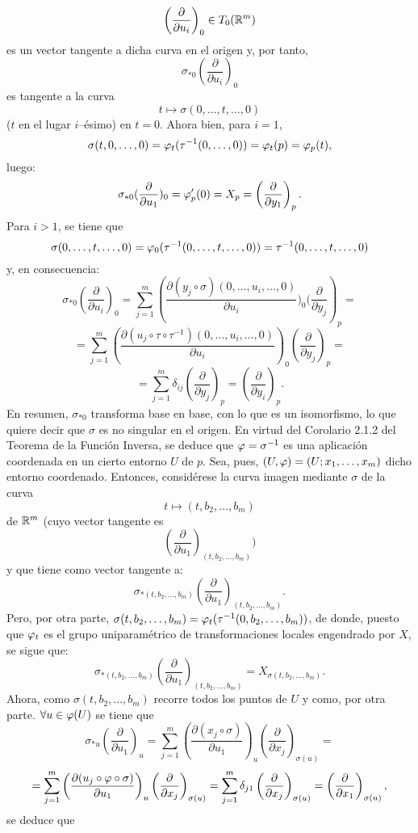 \documentclass[cursovd_portada.tex]{subfiles}
\begin{document}
$$\left(\frac{\partial}{\partial u_i}\right)_0\in T_0(\mathbb{R}^m)$$
es un vector tangente a dicha curva en el origen y, por tanto,
$$\sigma_{*0}\left(\frac{\partial}{\partial u_i}\right)_0$$
es tangente a la curva
$$t\mapsto\sigma(0,\dots ,t,\dots ,0)$$
($t$ en el lugar $i$--\'{e}simo) en $t=0$. Ahora bien, para $i=1$,
$$\sigma(t,0,\dots ,0)=\varphi_t(\tau^{-1}(0,\dots ,0))=\varphi_t(p)=\varphi_p(t),$$
luego:
$$\sigma_{*0}(\frac{\partial}{\partial u_1})_0=\varphi'_p(0)=X_p=\left(\frac{\partial}
{\partial y_1}\right)_p.$$ \hs Para $i>1$, se tiene que
$$\sigma(0,\dots ,t,\dots ,0)=\varphi_0(\tau^{-1}(0,\dots ,t,\dots ,0))=\tau^{-1}
(0,\dots ,t,\dots ,0)$$ y, en consecuencia:
$$\sigma_{*0}\left(\frac{\partial}{\partial u_i}\right)_0=\sum_{j=1}^m\left(\frac{\partial(y_j
\circ\sigma)(0,\dots ,u_i,\dots ,0)}{\partial u_i})_0(\frac{\partial}{\partial y_j}\right)_p=$$
$$=\sum_{j=1}^m\left(\frac{\partial(u_j\circ\tau\circ\tau^{-1})(0,\dots ,u_i,\dots ,
0)}{\partial u_i}\right)_0\left(\frac{\partial}{\partial y_j}\right)_p=$$
$$=\sum_{j=1}^m\delta_{ij}\left(\frac{\partial}{\partial y_j}\right)_p=(\frac{\partial}
{\partial y_i})_p.$$ \hs En resumen, $\sigma_{*0}$ transforma base en base, con lo que es un isomorfismo, lo que
quiere decir que $\sigma$ es no singular en el origen. En virtud del Corolario 2.1.2 del Teorema de la Funci\'{o}n
Inversa, se deduce que $\varphi=\sigma^{-1}$ es una aplicaci\'{o}n coordenada en un cierto entorno $U$ de $p$. Sea, pues,
$(U,\varphi)=(U;x_1,\dots ,x_m)$ dicho entorno coordenado. Entonces, consid\'{e}rese la curva imagen mediante $\sigma$ de
la curva
$$t\mapsto(t,b_2,\dots ,b_m)$$
de $\mathbb{R}^m$ (cuyo vector tangente es
$$\left(\frac{\partial}{\partial u_1}\right)_{(t,b_2,\dots ,b_m)})$$
y que tiene como vector tangente a:
$$\sigma_{*(t,b_2,\dots ,b_m)}\left(\frac{\partial}{\partial u_1}\right)_{(t,b_2,\dots ,
b_m)}.$$ \hs Pero, por otra parte, $\sigma(t,b_2,\dots ,b_m)=\varphi_t(\tau^{-1}(0,b_2,\dots , b_m))$, de donde,
puesto que $\varphi_t$ es el grupo uniparam\'{e}trico de transformaciones locales engendrado por $X$, se sigue que:
$$\sigma_{*(t,b_2,\dots ,b_m)}\left(\frac{\partial}{\partial u_1}\right)_{(t,b_2,\dots ,
b_m)}=X_{\sigma(t,b_2,\dots ,b_m)}.$$ \hs Ahora, como $\sigma(t,b_2,\dots ,b_m)$ recorre todos los puntos de $U$ y
como, por otra parte. $\forall u\in\varphi(U)$ se tiene que
$$\sigma_{*u}\left(\frac{\partial}{\partial u_1}\right)_u=\sum_{j=1}^m\left(\frac{\partial(x_j
\circ\sigma)}{\partial u_1}\right)_u\left(\frac{\partial}{\partial x_j}\right)_{\sigma(u)}=$$
$$=\sum_{j=1}^m\left(\frac{\partial(u_j\circ\varphi\circ\sigma)}{\partial u_1}\right)_u\left(\frac{
\partial}{\partial x_j}\right)_{\sigma(u)}=\sum_{j=1}^m\delta_{j1}\left(\frac{\partial}
{\partial x_j}\right)_{\sigma(u)}=\left(\frac{\partial}{\partial x_1}\right)_{\sigma(u)},$$ se deduce que
\end{document}
